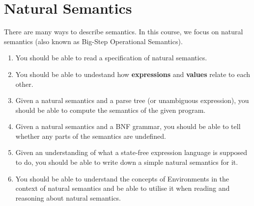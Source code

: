 \section{Natural Semantics}\label{sec:Natural_Semantics}
There are many ways to describe semantics.
In this course, we focus on natural semantics (also known as Big-Step Operational Semantics).

\begin{enumerate}[noitemsep]
\item You should be able to read a specification of natural semantics.
\item You should be able to undestand how \textbf{expressions} and \textbf{values} relate to each other.
\item Given a natural semantics and a parse tree (or unambiguous expression), you should be able to compute the semantics of the given program.
\item Given a natural semantics and a BNF grammar, you should be able to tell whether any parts of the semantics are undefined.
\item Given an understanding of what a state-free expression language is supposed to do, you should be able to write down a simple natural semantics for it.
\item You should be able to understand the concepts of Environments in the context of natural semantics and be able to utilise it when reading and reasoning about natural semantics.
\end{enumerate}

